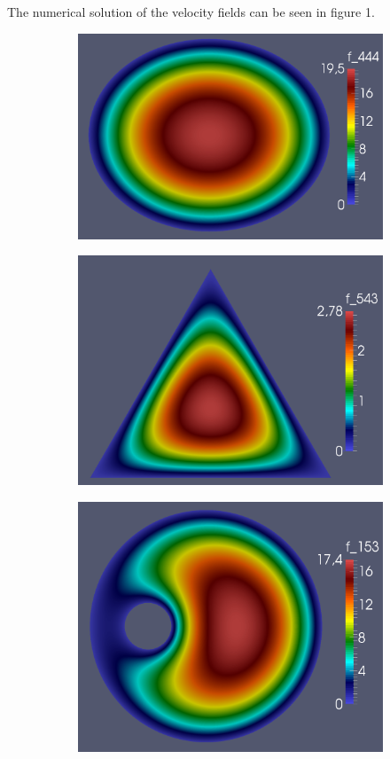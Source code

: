 \documentclass[11pt]{report}
\begin{document}
The numerical solution of the velocity fields can be seen in figure 1.

\begin{figure}[htb]
\begin{subfigure}{.3\textwidth}
	\centering
	\includegraphics[width=.9\linewidth]{images/ex1_47.png}
\end{subfigure}
\begin{subfigure}{.3\textwidth}
	\centering
	\includegraphics[width=.9\linewidth]{images/ex1_49.png}
\end{subfigure}
\begin{subfigure}{.3\textwidth}
	\centering
	\includegraphics[width=.9\linewidth]{images/ex1_52.png}

\end{subfigure}
\end{figure}
\end{document}
